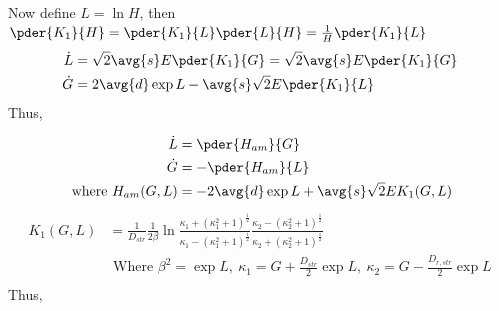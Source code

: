 Now define $L = \ln{H}$, then $\pder{K_1}{H} = \pder{K_1}{L}\pder{L}{H} = \frac{1}{H} \pder{K_1}{L}$
\begin{equation}
\begin{split}
\dot{L} &=   \sqrt{2}\avg{s}E \pder{K_1}{G}  = \sqrt{2}\avg{s}E \pder{K_1}{G}  \\ 
\dot{G} &= 2 \avg{d} \exp{L} - \avg{s}\sqrt{2} E \pder{K_1}{L} \\
\end{split}
\end{equation}
Thus,

\begin{equation}
\begin{split}
\dot{L} &=   \pder{H_{am}}{G}\\ 
\dot{G} &= -\pder{H_{am}}{L}  \\
\mbox{ where } H_{am}(G,L) &=  -2 \avg{d} \exp{L} + \avg{s}\sqrt{2} E K_1(G,L) \\
\end{split}
\end{equation}
    \begin{equation}
    \begin{split}
    K_1(G,L) & =  \frac{1}{D_{str}} \frac{1}{2\beta}  \ln{\frac{ \kappa_{1} + \left(\kappa_{1}^2+1\right)^{\frac{1}{2}}}{\kappa_{1} - \left(\kappa_{1}^2+1\right)^{\frac{1}{2}}} \frac{\kappa_{2} - \left(\kappa_{2}^2+1\right)^{\frac{1}{2}}}{\kappa_{2} + \left(\kappa_{2}^2+1\right)^{\frac{1}{2}}}}\\
    &\mbox{ Where } \beta^2 = \exp{L},\ \kappa_1 = G + \frac{D_{str}}{2}\exp{L},\ \kappa_2 = G - \frac{D_{r,str}}{2}\exp{L} \\
    \end{split}
    \end{equation}
Thus,

